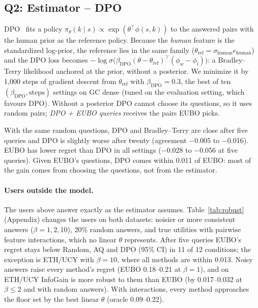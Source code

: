 

\subsection{Q2: Estimator -- DPO}
\label{sec:dpo}
DPO~\citep{rafailov2023direct} fits a policy $\pi_\theta(k \mid s) \propto \exp(\theta^\top\phi(s,k))$ to the answered pairs with the
human prior as the reference policy. Because the \emph{human} feature is the standardized log-prior, the reference lies in the same family
($\theta_{\text{ref}} = \sigma_{\text{human}} e_{\text{human}}$) and the DPO loss becomes
$-\log\sigma\bigl(\beta_{\text{DPO}}(\theta - \theta_{\text{ref}})^\top(\phi_w - \phi_l)\bigr)$: a Bradley--Terry likelihood anchored at the
prior, without a posterior. We minimize it by 1{,}000 steps of gradient descent from $\theta_{\text{ref}}$ with $\beta_{\text{DPO}}=0.3$,
the best of ten $(\beta_{\text{DPO}}, \text{steps})$ settings on GC dense (tuned on the evaluation setting, which favours DPO).
Without a posterior DPO cannot choose its questions, so it uses random pairs; \emph{DPO + EUBO queries} receives the pairs EUBO picks.

With the same random questions, DPO and Bradley--Terry are close after five queries and DPO is slightly worse after twenty
(agreement $-$0.005 to $-$0.016). EUBO has lower regret than DPO in all settings ($-$0.028 to $-$0.056 at five queries).
Given EUBO's questions, DPO comes within 0.011 of EUBO: most of the gain comes from choosing the questions, not from the estimator.

\paragraph{Users outside the model.}
The users above answer exactly as the estimator assumes. Table~\ref{tab:robust} (Appendix) changes the users on both datasets: noisier
or more consistent answers ($\beta=1,2,10$), 20\% random answers, and true utilities with pairwise feature interactions, which no linear
$\theta$ represents. After five queries EUBO's regret stays below Random, AQ and DPO (95\% CI) in 11 of 12 conditions; the exception is
ETH/UCY with $\beta=10$, where all methods are within 0.013. Noisy answers raise every method's regret (EUBO 0.18--0.21 at $\beta=1$), and
on ETH/UCY InfoGain is more robust to them than EUBO (by 0.017--0.032 at $\beta \le 2$ and with random answers). With interactions, every
method approaches the floor set by the best linear $\theta$ (oracle 0.09--0.22).

